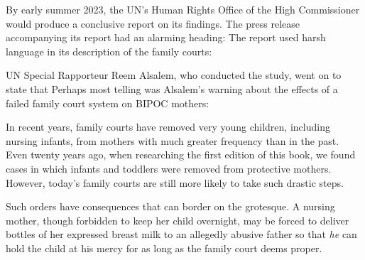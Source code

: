 By early summer 2023, the UN's Human Rights Office of the High
Commissioner would produce a conclusive report on its findings. The
press release accompanying its report had an alarming heading:
 The report used harsh language 
in its description of
the family courts:  \pfl{}

UN Special Rapporteur Reem Alsalem, who conducted the study,
went on to state that  Perhaps most telling was Alsalem's warning about the
effects of a failed family court system on BIPOC mothers: \hspace{1pt} \pfl{}

\vspace{3em}

\noindent{}In recent years, family courts have removed very young children,
including nursing infants, from mothers with much greater frequency
than in the past. Even twenty years ago, when researching the first edition of
this book, we found cases in which infants and toddlers were removed
from protective mothers. However, today’s family courts are still more
likely to take such drastic steps. \pfl{}

Such orders have consequences that can border on the grotesque. A
nursing mother, though forbidden to keep her child overnight, may be
forced to deliver bottles of her expressed breast milk to an allegedly 
abusive father so that \textit{he} can hold the child at his mercy for as long as the
family court deems proper. \pfl{}

